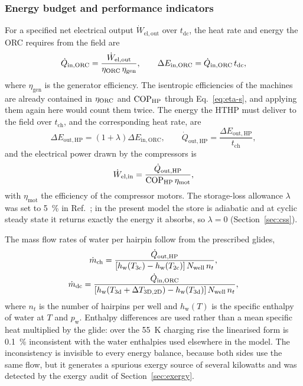 \subsubsection{Energy budget and performance indicators}
\label{sec:budget}

For a specified net electrical output $\dot W_\mathrm{el,out}$ over
$t_\mathrm{dc}$, the heat rate and energy the ORC requires from the field are
\begin{equation}
  \dot Q_\mathrm{in,ORC}=\frac{\dot W_\mathrm{el,out}}
     {\eta_{\mathrm{ORC}}\,\eta_\mathrm{gen}},
  \qquad
  \Delta E_\mathrm{in,ORC}=\dot Q_\mathrm{in,ORC}\,t_\mathrm{dc},
  \label{eq:E-orc}
\end{equation}
where $\eta_\mathrm{gen}$ is the generator efficiency. The isentropic
efficiencies of the machines are already contained in $\eta_{\mathrm{ORC}}$ and $\mathrm{COP}_{\mathrm{HP}}$
through Eq.~\eqref{eq:eta-s}, and applying them again here would count them
twice. The energy
the HTHP must deliver to the field over $t_\mathrm{ch}$, and the
corresponding heat rate, are
\begin{equation}
  \Delta E_\mathrm{out,HP}=\left(1+\lambda\right)\Delta E_\mathrm{in,ORC},
  \qquad
  \dot Q_\mathrm{out,HP}=\frac{\Delta E_\mathrm{out,HP}}{t_\mathrm{ch}},
  \label{eq:E-hp}
\end{equation}
and the electrical power drawn by the compressors is
\begin{equation}
  \dot W_\mathrm{el,in}=\frac{\dot Q_\mathrm{out,HP}}
    {\mathrm{COP}_{\mathrm{HP}}\,\eta_\mathrm{mot}},
  \label{eq:W-in}
\end{equation}
with $\eta_\mathrm{mot}$ the efficiency of the compressor motors. The storage-loss allowance $\lambda$
was set to \SI{5}{\percent} in Ref.~\cite{KoIHTC2026}; in the present model
the store is adiabatic and at cyclic steady state it returns exactly the
energy it absorbs, so $\lambda=0$ (Section~\ref{sec:css}).

The mass flow rates of water per hairpin follow from the prescribed glides,
\begin{gather}
  \dot m_\mathrm{ch}=\frac{\dot Q_\mathrm{out,HP}}
     {\left[h_\mathrm{w}(T_\mathrm{3c})-h_\mathrm{w}(T_\mathrm{2c})\right]N_{\mathrm{well}}\,n_{t}},
  \notag\\
  \dot m_\mathrm{dc}=\frac{\dot Q_\mathrm{in,ORC}}
     {\left[h_\mathrm{w}(T_\mathrm{3d}+\Delta T_\mathrm{3D,2D})-h_\mathrm{w}(T_\mathrm{3d})\right]N_{\mathrm{well}}\,n_{t}},
  \label{eq:mdot}
\end{gather}
where $n_t$ is the number of hairpins per well and $h_\mathrm{w}(T)$ is the
specific enthalpy of water at $T$ and $p_\mathrm{w}$. Enthalpy differences are
used rather than a mean specific heat multiplied by the glide: over the
\SI{55}{\kelvin} charging rise the linearised form is \SI{0.1}{\percent}
inconsistent with the water enthalpies used elsewhere in the model. The
inconsistency is invisible to every energy balance, because both sides use the
same flow, but it generates a spurious exergy source of several kilowatts and
was detected by the exergy audit of Section~\ref{sec:exergy}.

